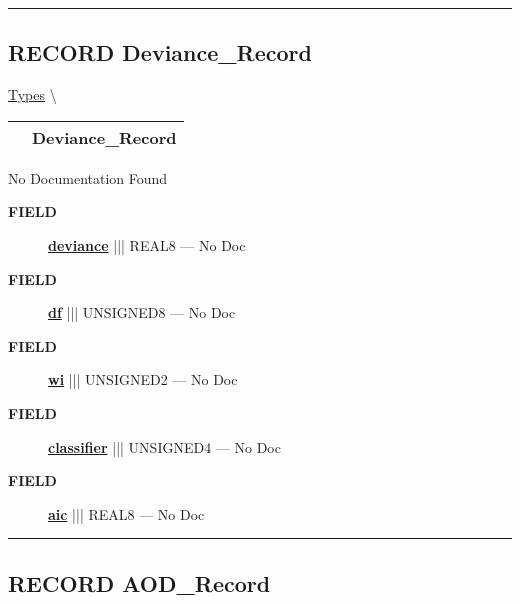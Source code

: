 \rule{\linewidth}{0.5pt}
\subsection*{\textsf{\colorbox{headtoc}{\color{white} RECORD}
Deviance\_Record}}

\hypertarget{ecldoc:logisticregression.types.deviance_record}{}
\hspace{0pt} \hyperlink{ecldoc:LogisticRegression.Types}{Types} \textbackslash 

{\renewcommand{\arraystretch}{1.5}
\begin{tabularx}{\textwidth}{|>{\raggedright\arraybackslash}l|X|}
\hline
\hspace{0pt}\mytexttt{\color{red} } & \textbf{Deviance\_Record} \\
\hline
\end{tabularx}
}

\par





No Documentation Found







\par
\begin{description}
\item [\colorbox{tagtype}{\color{white} \textbf{\textsf{FIELD}}}] \textbf{\underline{deviance}} ||| REAL8 --- No Doc
\item [\colorbox{tagtype}{\color{white} \textbf{\textsf{FIELD}}}] \textbf{\underline{df}} ||| UNSIGNED8 --- No Doc
\item [\colorbox{tagtype}{\color{white} \textbf{\textsf{FIELD}}}] \textbf{\underline{wi}} ||| UNSIGNED2 --- No Doc
\item [\colorbox{tagtype}{\color{white} \textbf{\textsf{FIELD}}}] \textbf{\underline{classifier}} ||| UNSIGNED4 --- No Doc
\item [\colorbox{tagtype}{\color{white} \textbf{\textsf{FIELD}}}] \textbf{\underline{aic}} ||| REAL8 --- No Doc
\end{description}





\rule{\linewidth}{0.5pt}
\subsection*{\textsf{\colorbox{headtoc}{\color{white} RECORD}
AOD\_Record}}


